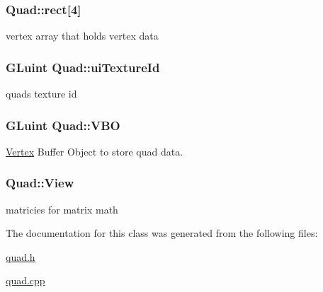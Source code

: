\subsubsection[{rect}]{ Quad\+::rect\mbox{[}4\mbox{]}}\label{class_quad_afaed261444ab07e840d903baff5c0624}


vertex array that holds vertex data 

\hypertarget{class_quad_a04b4a7628b803cdedfac290a26e97f75}{}
\subsubsection[{ui\+Texture\+Id}]{\setlength{\rightskip}{0pt plus 5cm}G\+Luint Quad\+::ui\+Texture\+Id}\label{class_quad_a04b4a7628b803cdedfac290a26e97f75}


quad\textquotesingle{}s texture id 

\hypertarget{class_quad_af710bcaf3209f47cb75dfed003604fd4}{}
\subsubsection[{V\+B\+O}]{\setlength{\rightskip}{0pt plus 5cm}G\+Luint Quad\+::\+V\+B\+O}\label{class_quad_af710bcaf3209f47cb75dfed003604fd4}


\hyperlink{struct_vertex}{Vertex} Buffer Object to store quad data. 

\hypertarget{class_quad_a25e399068755865ba1e2c25d01837863}{}
\subsubsection[{View}]{ Quad\+::\+View}\label{class_quad_a25e399068755865ba1e2c25d01837863}


matricies for matrix math 



The documentation for this class was generated from the following files\+:\begin{DoxyCompactItemize}
\item 
\hyperlink{quad_8h}{quad.\+h}\item 
\hyperlink{quad_8cpp}{quad.\+cpp}\end{DoxyCompactItemize}
